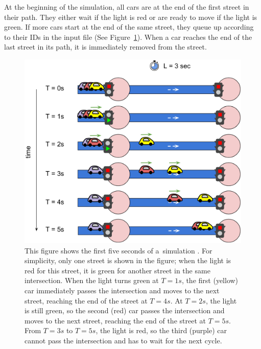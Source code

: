 At the beginning of the simulation, all cars are at the end of the first street in their path. They either wait if the light is red or are ready to move if the light is green. If more cars start at the end of the same street, they queue up according to their IDs in the input file (See Figure~\ref{fig:hashcode_street}). When a car reaches the end of the last street in its path, it is immediately removed from the street.

\begin{figure}[ht] %
    \centering
    \includegraphics[width=\linewidth]{img/hashcode/figure3.png}
    \caption[Example of cars driving through a street]{
        This figure shows the first five seconds of a~simulation \cite{google2023google}.
        For simplicity, only one street is shown in the figure; when the light is red for this street, it is green for another street in the same intersection.
        When the light turns green at $T=1s$, the first (yellow) car immediately passes the intersection and moves to the next street, reaching the end of the street at $T=4s$.
        At $T=2s$, the light is still green, so the second (red) car passes the intersection and moves to the next street, reaching the end of the street at $T=5s$.
        From $T=3s$ to $T=5s$, the light is red, so the third (purple) car cannot pass the intersection and has to wait for the next cycle.
    }
    \label{fig:hashcode_street}
\end{figure}

